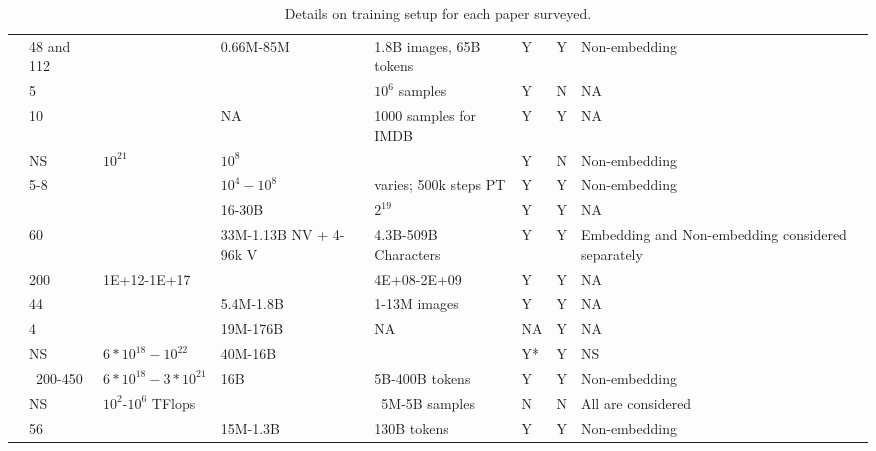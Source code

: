\begin{table}[]
{\begin{tabular}{llllllll}
\cite{frantar2023scaling} & 48 and 112 &  & 0.66M-85M  & 1.8B images, 65B tokens & Y & Y & Non-embedding \\
\cite{prato2021scaling} & 5 &  &  & $10^6$ samples & Y & N & NA \\
\cite{covert2024scaling} & 10 &  & NA & 1000 samples for IMDB & Y & Y & NA \\
\cite{hernandez2021scaling} & NS & $10^{21}$ & $10^8$ &  & Y & N & Non-embedding \\
\cite{ivgi2022scaling} & 5-8 &  & $10^4-10^8$ & varies; 500k steps PT & Y & Y & Non-embedding \\
\cite{tay2022scaling} &  &  & 16-30B & $2^19$ & Y & Y & NA \\
\cite{tao2024scaling} & 60 &  & 33M-1.13B NV + 4-96k V & 4.3B-509B Characters & Y & Y & Embedding and Non-embedding considered separately \\
\cite{jones2021scaling} & 200 & 1E+12-1E+17 &  & 4E+08-2E+09 & Y & Y & NA \\
\cite{zhai2022scaling} & 44 &  & 5.4M-1.8B & 1-13M images & Y & Y & NA \\
\cite{dettmers2023case} & 4 &  & 19M-176B & NA & NA & Y & NA \\
\cite{dubey2024llama} & NS & $6*10^{18}-10^22$ & 40M-16B &  & Y* & Y & NS \\
\cite{hoffmann2022training} & ~200-450 & $6*10^{18}-3*10^{21}$ & 16B & 5B-400B tokens & Y & Y & Non-embedding \\
\cite{ardalani2022understanding} & NS & $10^2$-$10^6$ TFlops &  & ~5M-5B samples & N & N & All are considered \\
\cite{clark2022unified} & 56 &  & 15M-1.3B & 130B tokens & Y & Y & Non-embedding \\
\bottomrule
\end{tabular}

}

\caption{Details on training setup for each paper surveyed.}
\label{tab:full-setup}
\end{table}

